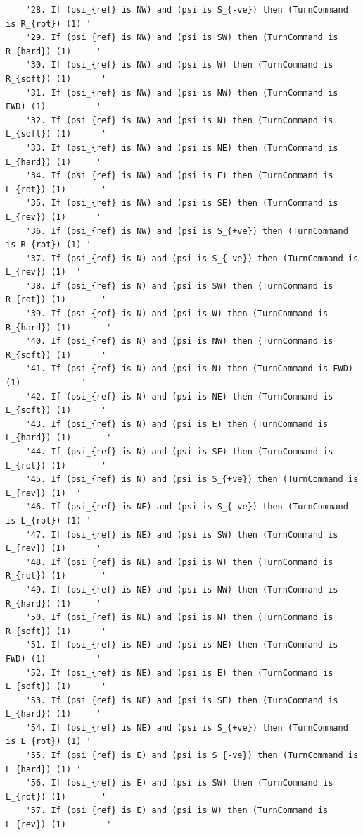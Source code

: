 \documentclass[10pt]{article}
\begin{document}
\begin{verbatim}
    '28. If (psi_{ref} is NW) and (psi is S_{-ve}) then (TurnCommand is R_{rot}) (1) '
    '29. If (psi_{ref} is NW) and (psi is SW) then (TurnCommand is R_{hard}) (1)     '
    '30. If (psi_{ref} is NW) and (psi is W) then (TurnCommand is R_{soft}) (1)      '
    '31. If (psi_{ref} is NW) and (psi is NW) then (TurnCommand is FWD) (1)          '
    '32. If (psi_{ref} is NW) and (psi is N) then (TurnCommand is L_{soft}) (1)      '
    '33. If (psi_{ref} is NW) and (psi is NE) then (TurnCommand is L_{hard}) (1)     '
    '34. If (psi_{ref} is NW) and (psi is E) then (TurnCommand is L_{rot}) (1)       '
    '35. If (psi_{ref} is NW) and (psi is SE) then (TurnCommand is L_{rev}) (1)      '
    '36. If (psi_{ref} is NW) and (psi is S_{+ve}) then (TurnCommand is R_{rot}) (1) '
    '37. If (psi_{ref} is N) and (psi is S_{-ve}) then (TurnCommand is L_{rev}) (1)  '
    '38. If (psi_{ref} is N) and (psi is SW) then (TurnCommand is R_{rot}) (1)       '
    '39. If (psi_{ref} is N) and (psi is W) then (TurnCommand is R_{hard}) (1)       '
    '40. If (psi_{ref} is N) and (psi is NW) then (TurnCommand is R_{soft}) (1)      '
    '41. If (psi_{ref} is N) and (psi is N) then (TurnCommand is FWD) (1)            '
    '42. If (psi_{ref} is N) and (psi is NE) then (TurnCommand is L_{soft}) (1)      '
    '43. If (psi_{ref} is N) and (psi is E) then (TurnCommand is L_{hard}) (1)       '
    '44. If (psi_{ref} is N) and (psi is SE) then (TurnCommand is L_{rot}) (1)       '
    '45. If (psi_{ref} is N) and (psi is S_{+ve}) then (TurnCommand is L_{rev}) (1)  '
    '46. If (psi_{ref} is NE) and (psi is S_{-ve}) then (TurnCommand is L_{rot}) (1) '
    '47. If (psi_{ref} is NE) and (psi is SW) then (TurnCommand is L_{rev}) (1)      '
    '48. If (psi_{ref} is NE) and (psi is W) then (TurnCommand is R_{rot}) (1)       '
    '49. If (psi_{ref} is NE) and (psi is NW) then (TurnCommand is R_{hard}) (1)     '
    '50. If (psi_{ref} is NE) and (psi is N) then (TurnCommand is R_{soft}) (1)      '
    '51. If (psi_{ref} is NE) and (psi is NE) then (TurnCommand is FWD) (1)          '
    '52. If (psi_{ref} is NE) and (psi is E) then (TurnCommand is L_{soft}) (1)      '
    '53. If (psi_{ref} is NE) and (psi is SE) then (TurnCommand is L_{hard}) (1)     '
    '54. If (psi_{ref} is NE) and (psi is S_{+ve}) then (TurnCommand is L_{rot}) (1) '
    '55. If (psi_{ref} is E) and (psi is S_{-ve}) then (TurnCommand is L_{hard}) (1) '
    '56. If (psi_{ref} is E) and (psi is SW) then (TurnCommand is L_{rot}) (1)       '
    '57. If (psi_{ref} is E) and (psi is W) then (TurnCommand is L_{rev}) (1)        '

\end{verbatim}
\end{document}
